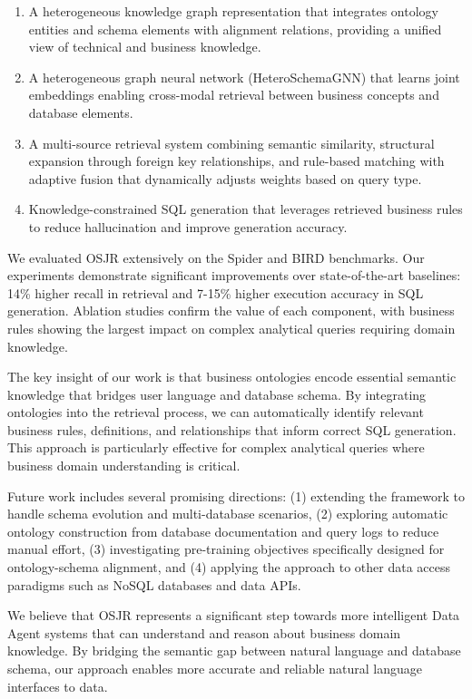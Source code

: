 \documentclass[sigconf, nonatbib]{acmart}
\begin{document}
\begin{enumerate}
    \item A heterogeneous knowledge graph representation that integrates ontology entities and schema elements with alignment relations, providing a unified view of technical and business knowledge.
    
    \item A heterogeneous graph neural network (HeteroSchemaGNN) that learns joint embeddings enabling cross-modal retrieval between business concepts and database elements.
    
    \item A multi-source retrieval system combining semantic similarity, structural expansion through foreign key relationships, and rule-based matching with adaptive fusion that dynamically adjusts weights based on query type.
    
    \item Knowledge-constrained SQL generation that leverages retrieved business rules to reduce hallucination and improve generation accuracy.
\end{enumerate}

We evaluated OSJR extensively on the Spider and BIRD benchmarks. Our experiments demonstrate significant improvements over state-of-the-art baselines: 14\% higher recall in retrieval and 7-15\% higher execution accuracy in SQL generation. Ablation studies confirm the value of each component, with business rules showing the largest impact on complex analytical queries requiring domain knowledge.

The key insight of our work is that business ontologies encode essential semantic knowledge that bridges user language and database schema. By integrating ontologies into the retrieval process, we can automatically identify relevant business rules, definitions, and relationships that inform correct SQL generation. This approach is particularly effective for complex analytical queries where business domain understanding is critical.

Future work includes several promising directions: (1) extending the framework to handle schema evolution and multi-database scenarios, (2) exploring automatic ontology construction from database documentation and query logs to reduce manual effort, (3) investigating pre-training objectives specifically designed for ontology-schema alignment, and (4) applying the approach to other data access paradigms such as NoSQL databases and data APIs.

We believe that OSJR represents a significant step towards more intelligent Data Agent systems that can understand and reason about business domain knowledge. By bridging the semantic gap between natural language and database schema, our approach enables more accurate and reliable natural language interfaces to data.
\end{document}
